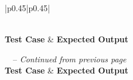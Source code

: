 \documentclass[12pt, titlepage]{article}
\begin{document}
\begin{longtable}{|p{}|p{}|}
  \caption{Sample Unit Test Cases} \label{tab:sample_tests} \\
  \hline
  \textbf{Test Case} & \textbf{Expected Output} \\
  \hline
  \endfirsthead
  
  {\tablename\ \thetable\ -- \textit{Continued from previous page}} \\
  \hline
  \textbf{Test Case} & \textbf{Expected Output} \\
  \hline
  \endhead
  
  \hline {} \\
  \endfoot
  
  \hline
  \endlastfoot
  

\end{longtable}
\end{document}
